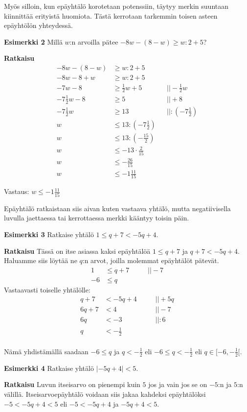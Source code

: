 Myös silloin, kun epäyhtälö korotetaan potenssiin, täytyy merkin suuntaan kiinnittää erityistä huomiota.
Tästä kerrotaan tarkemmin toisen asteen epäyhtölön yhteydessä.

\textbf{Esimerkki 2}
Millä $w$:n arvoilla pätee $-8w-(8-w)\geq w:2+5$?

\textbf{Ratkaisu}
\begin{align*}
-8w-(8-w)&\geq w:2+5 \\
-8w-8+w&\geq w:2+5 \\
-7w-8&\geq \frac12 w+5  \ \ \ \ \ &&|| -\frac12 w \\
-7\frac12 w-8&\geq 5  \ \ \ \ \ &&|| +8 \\
-7\frac12 w&\geq 13  \ \ \ \ \ &&|| :(-7\frac12) \\
w&\leq 13:(-7\frac12) \\
w&\leq 13:(-\frac{15}{2}) \\
w&\leq -13\cdot \frac{2}{15} \\
w&\leq -\frac{26}{15} \\
w&\leq -1\frac{11}{15}
\end{align*}

Vastaus: $w\leq -1\frac{11}{15}$

Epäyhtälö ratkaistaan siis aivan kuten vastaava yhtälö, mutta negatiivisella luvulla
jaettaessa tai kerrottaessa merkki kääntyy toisin päin.

\textbf{Esimerkki 3}
Ratkaise yhtälö $1\leq q+7<-5q+4$.

\textbf{Ratkaisu}
Tässä on itse asiassa kaksi epäyhtälöä $1\leq q+7$ ja $q+7<-5q+4$. Haluamme siis löytää ne $q$:n arvot, joilla molemmat epäyhtälöt pätevät.
\begin{align*}
1&\leq q+7 \ \ \ \ \ &&|| -7 \\
-6&\leq q
\end{align*}
Vastaavasti toiselle yhtälölle:
\begin{align*}
q+7&<-5q+4  \ \ \ \ \ &&|| +5q \\
6q+7&<4 &&|| -7 \\
6q&<-3 &&|| :6 \\
q&< -\frac12 \\
\end{align*}

Nämä yhdistämällä saadaan $-6\leq q$ ja $q< -\frac12$ eli $-6\leq q < -\frac12$ eli $q\in [-6, -\frac12[$.

\textbf{Esimerkki 4}
Ratkaise yhtälö $|-5q+4|<5$.

\textbf{Ratkaisu}
Luvun itseisarvo on pienempi kuin $5$ jos ja vain jos se on $-5$:n ja $5$:n välillä.
Itseisarvoepäyhtälö voidaan siis jakaa kahdeksi epäyhtälöksi $-5<-5q+4<5$ eli $-5<-5q+4$ ja $-5q+4<5$.

